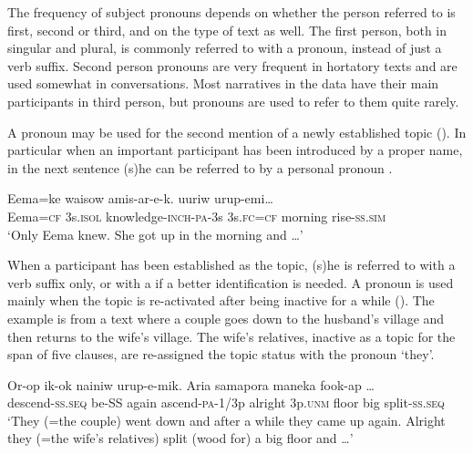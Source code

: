 The frequency of subject pronouns depends on whether the person referred to is first, second or third, and on the type of text as well. The first person, both in singular and plural, is commonly referred to with a pronoun, instead of just a verb suffix. Second person pronouns are very frequent in hortatory texts and are used somewhat in conversations. Most narratives in the data have their main participants in third person, but pronouns are used to refer to them quite rarely. 

A pronoun may be used for the second mention of a newly established topic (). In particular when an important participant has been introduced by a proper name, in the next sentence (s)he can be referred to by a personal pronoun . 

\ea%
\label{ex:3:x1867}
\gll Eema=ke waisow amis-ar-e-k.  uuriw urup-emi{\dots}\\
Eema=\textsc{cf} 3s.\textsc{isol} knowledge-\textsc{inch}-\textsc{pa}-3s 3s.\textsc{fc}=\textsc{cf} morning rise-\textsc{ss}.\textsc{sim}\\
\glt`Only Eema knew. She got up in the morning and {\dots}'
\z

When a participant has been established as the topic, (s)he is referred to with a verb suffix only, or with a  if a better identification is needed. A pronoun is used mainly when the topic is re-activated after being inactive for a while (). The example  is from a text where a couple goes down to the husband's village and then returns to the wife's village. The wife's relatives, inactive as a topic for the span of five clauses, are re-assigned the topic status with the pronoun  `they'. 

\ea%
\label{ex:3:x1922}
\gll Or-op ik-ok nainiw urup-e-mik. Aria  samapora maneka fook-ap {\dots}\\
descend-\textsc{ss}.\textsc{seq} be-SS again ascend-\textsc{pa}-1/3p alright 3p.\textsc{unm} floor big split-\textsc{ss}.\textsc{seq} \\
\glt`They (=the couple) went down and after a while they came up again. Alright they (=the wife's relatives) split (wood for) a big floor and {\dots}'
\z


